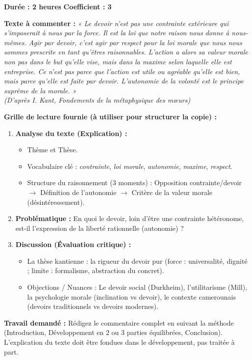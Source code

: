 \documentclass[11pt]{article}
\begin{document}
\begin{exercice}
\textbf{Durée : 2 heures} \hfill \textbf{Coefficient : 3}

\textbf{Texte à commenter :}
\textit{« Le devoir n'est pas une contrainte extérieure qui s'imposerait à nous par la force. Il est la loi que notre raison nous donne à nous-mêmes. Agir par devoir, c'est agir par respect pour la loi morale que nous nous sommes prescrite en tant qu'êtres raisonnables. L'action a alors sa valeur morale non pas dans le but qu'elle vise, mais dans la maxime selon laquelle elle est entreprise. Ce n'est pas parce que l'action est utile ou agréable qu'elle est bien, mais parce qu'elle est faite par devoir. L'autonomie de la volonté est le principe suprême de la morale. »} \\
\textit{(D'après I. Kant, \emph{Fondements de la métaphysique des mœurs})}

\textbf{Grille de lecture fournie (à utiliser pour structurer la copie) :}
\begin{enumerate}
\item \textbf{Analyse du texte (Explication) :}
      \begin{itemize}
      \item Thème et Thèse.
      \item Vocabulaire clé : \emph{contrainte}, \emph{loi morale}, \emph{autonomie}, \emph{maxime}, \emph{respect}.
      \item Structure du raisonnement (3 moments) : Opposition contrainte/devoir $\rightarrow$ Définition de l'autonomie $\rightarrow$ Critère de la valeur morale (désintéressement).
      \end{itemize}
\item \textbf{Problématique :} En quoi le devoir, loin d'être une contrainte hétéronome, est-il l'expression de la liberté rationnelle (autonomie) ?
\item \textbf{Discussion (Évaluation critique) :}
      \begin{itemize}
      \item La thèse kantienne : la rigueur du devoir pur (force : universalité, dignité ; limite : formalisme, abstraction du concret).
      \item Objections / Nuances : Le devoir social (Durkheim), l'utilitarisme (Mill), la psychologie morale (inclination vs devoir), le contexte camerounais (devoirs traditionnels vs devoirs modernes).
      \end{itemize}
\end{enumerate}

\textbf{Travail demandé :}
Rédigez le commentaire complet en suivant la méthode (Introduction, Développement en 2 ou 3 parties équilibrées, Conclusion). L'explication du texte doit être fondues dans le développement, pas traitée à part.
\end{exercice}
\end{document}
